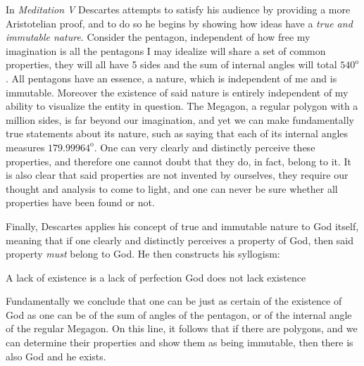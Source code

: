 \documentclass{article}
\begin{document}
In \textit{Meditation V} Descartes attempts to satisfy his audience by 
providing a more Aristotelian proof, and to do so he begins by showing how 
ideas have a \emph{true and immutable nature}. Consider the pentagon, 
independent of how free my imagination is all the pentagons I may idealize will 
share a set of common properties, they will all have 5 sides and the sum of 
internal angles will total \(540^{\text{o}}\). All pentagons have an essence, a 
nature, which is independent of me and is immutable. Moreover the existence of 
said nature is entirely independent of my ability to visualize the entity in 
question. The Megagon, a regular polygon with a million sides, is far beyond 
our imagination, and yet we can make fundamentally true statements about its 
nature, such as saying that each of its internal angles measures \(179.99964^
{\text{o}}\). One can very clearly and distinctly perceive these properties, 
and therefore one cannot doubt that they do, in fact, belong to it. It is also 
clear that said properties are not invented by ourselves, they require our 
thought and analysis to come to light, and one can never be sure whether all 
properties have been found or not.

Finally, Descartes applies his concept of true and immutable nature to God 
itself, meaning that if one clearly and distinctly perceives a property of God, 
then said property \emph{must} belong to God. He then constructs his syllogism:
\begin{center}
    {A lack of existence is a lack of perfection}%
    {God does not lack existence} 
\end{center}
Fundamentally we conclude that one can be just as certain of the existence of God as one can be of the sum of angles of the pentagon, or of the internal angle of the regular Megagon. On this line, it follows that if there are polygons, and we can determine their properties and show them as being immutable, then there is also God and he exists.
\end{document}
